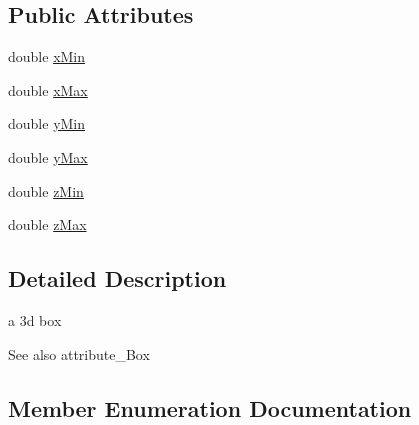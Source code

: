 \subsection*{Public Attributes}
\begin{DoxyCompactItemize}
\item 
double \hyperlink{classns3_1_1Box_a1fd6a43d53258323331d34da600ff1c5}{x\+Min}
\item 
double \hyperlink{classns3_1_1Box_a50021049c756e770329145b25d9533a2}{x\+Max}
\item 
double \hyperlink{classns3_1_1Box_a3865ed092f941186823539c9979002f8}{y\+Min}
\item 
double \hyperlink{classns3_1_1Box_a001fd430a14b19efe925c818a332e392}{y\+Max}
\item 
double \hyperlink{classns3_1_1Box_a9ab297b877a5c31dbfb344bd6f027e91}{z\+Min}
\item 
double \hyperlink{classns3_1_1Box_ae4d135764bbc8421fe82ec91e4693b59}{z\+Max}
\end{DoxyCompactItemize}


\subsection{Detailed Description}
a 3d box 

\begin{DoxySeeAlso}{See also}
attribute\+\_\+\+Box 
\end{DoxySeeAlso}


\subsection{Member Enumeration Documentation}
